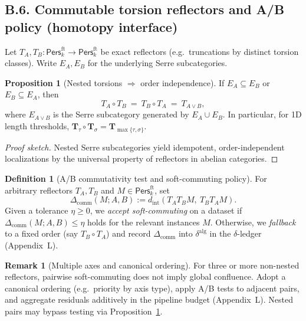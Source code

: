 \documentclass[11pt]{article}
\numberwithin{equation}{section}
\theoremstyle{plain}
\theoremstyle{definition}
\theoremstyle{remark}
\DeclareRobustCommand{\hyp}{\nobreakdash-}
\newcommand{\Pers}{\mathsf{Pers}}
\theoremstyle{plain}
\theoremstyle{definition}
\numberwithin{equation}{section}
\newtheorem{proposition}[theorem]{Proposition}
\theoremstyle{definition}
\newtheorem{definition}[theorem]{Definition}
\newtheorem{remark}[theorem]{Remark}
\numberwithin{equation}{section}
\theoremstyle{plain}
\theoremstyle{definition}
\theoremstyle{remark}
\begin{document}
\subsection*{B.6. Commutable torsion reflectors and A/B policy (homotopy interface)}
Let \(T_A,T_B:\Pers^{\mathrm{ft}}_k\to\Pers^{\mathrm{ft}}_k\) be exact reflectors (e.g.\ truncations by distinct torsion classes). Write \(E_A,E_B\) for the underlying Serre subcategories.

\begin{proposition}[Nested torsions \(\Rightarrow\) order independence]\label{B:prop:nested}
If \(E_A\subseteq E_B\) or \(E_B\subseteq E_A\), then
\[
T_A\circ T_B\ =\ T_B\circ T_A\ =\ T_{A\vee B},
\]
where \(E_{A\vee B}\) is the Serre subcategory generated by \(E_A\cup E_B\).
In particular, for 1D length thresholds, \(\mathbf{T}_\tau\circ \mathbf{T}_\sigma=\mathbf{T}_{\max\{\tau,\sigma\}}\).
\end{proposition}

\begin{proof}[Proof sketch]
Nested Serre subcategories yield idempotent, order\hyp independent localizations by the universal property of reflectors in abelian categories.
\end{proof}

\begin{definition}[A/B commutativity test and soft\hyp commuting policy]\label{B:def:ab}
For arbitrary reflectors \(T_A,T_B\) and \(M\in\Pers^{\mathrm{ft}}_k\), set
\[
\Delta_{\mathrm{comm}}(M;A,B):=d_{\mathrm{int}}(T_A T_B M,\ T_B T_A M).
\]
Given a tolerance \(\eta\ge 0\), we \emph{accept soft\hyp commuting} on a dataset if \(\Delta_{\mathrm{comm}}(M;A,B)\le \eta\) holds for the relevant instances \(M\). Otherwise, we \emph{fallback} to a fixed order (say \(T_B\circ T_A\)) and record \(\Delta_{\mathrm{comm}}\) into \(\delta^{\mathrm{alg}}\) in the \(\delta\)\hyp ledger (Appendix~L).
\end{definition}

\begin{remark}[Multiple axes and canonical ordering]
For three or more non\hyp nested reflectors, pairwise soft\hyp commuting does not imply global confluence.
Adopt a canonical ordering (e.g.\ priority by axis type), apply A/B tests to adjacent pairs, and aggregate residuals additively in the pipeline budget (Appendix~L). Nested pairs may bypass testing via Proposition~\ref{B:prop:nested}.
\end{remark}
\end{document}
